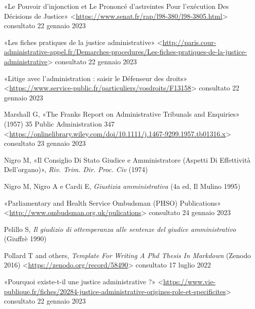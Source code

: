 \documentclass[12pt,it,a4paper,]{report}
\newlength{\cslhangindent}
\newenvironment{CSLReferences}[2] %
 {%
  \setlength{\parindent}{0pt}
  \ifodd #1 \everypar{\setlength{\hangindent}{\cslhangindent}}\ignorespaces\fi
  \ifnum #2 > 0
  \setlength{\parskip}{#2\baselineskip}
  \fi
 }%
 {}
\begin{document}
\begin{CSLReferences}{0}{0}
\leavevmode{}%
{«Le Pouvoir d'injonction et Le Prononcé d'astreintes Pour l'exécution
Des Décisions de Justice»}
\textless{}\url{https://www.senat.fr/rap/l98-380/l98-3805.html}\textgreater{}
consultato 22 gennaio 2023

\leavevmode{}%
{«Les fiches pratiques de la justice administrative»}
\textless{}\url{http://paris.cour-administrative-appel.fr/Demarches-procedures/Les-fiches-pratiques-de-la-justice-administrative}\textgreater{}
consultato 22 gennaio 2023

\leavevmode{}%
{«Litige avec l'administration : saisir le Défenseur des droits»}
\textless{}\url{https://www.service-public.fr/particuliers/vosdroits/F13158}\textgreater{}
consultato 22 gennaio 2023

\leavevmode{}%
Marshall G, {«The {Franks Report} on {Administrative Tribunals} and
{Enquiries}»} (1957) 35 Public Administration 347
\textless{}\url{https://onlinelibrary.wiley.com/doi/10.1111/j.1467-9299.1957.tb01316.x}\textgreater{}
consultato 23 gennaio 2023

\leavevmode{}%
Nigro M, {«Il {Consiglio} Di {Stato} Giudice e Amministratore (Aspetti
Di Effettività Dell'organo)»}, \emph{Riv. Trim. Dir. Proc. Civ} (1974)

\leavevmode{}%
Nigro M, Nigro A e Cardi E, \emph{Giustizia amministrativa} (4a ed, {Il
Mulino} 1995)

\leavevmode{}%
{«Parliamentary and {Health Service Ombudsman} ({PHSO}) Publications»}
\textless{}\url{http://www.ombudsman.org.uk/pulications}\textgreater{}
consultato 24 gennaio 2023

\leavevmode{}%
Pelillo S, \emph{Il giudizio di ottemperanza alle sentenze del giudice
amministrativo} ({Giuffrè} 1990)

\leavevmode{}%
Pollard T and others, \emph{Template {For Writing A Phd Thesis In
Markdown}} ({Zenodo} 2016)
\textless{}\url{https://zenodo.org/record/58490}\textgreater{}
consultato 17 luglio 2022

\leavevmode{}%
{«Pourquoi existe-t-il une justice administrative ?»}
\textless{}\url{https://www.vie-publique.fr/fiches/20284-justice-administrative-origines-role-et-specificites}\textgreater{}
consultato 22 gennaio 2023


\end{CSLReferences}
\end{document}

